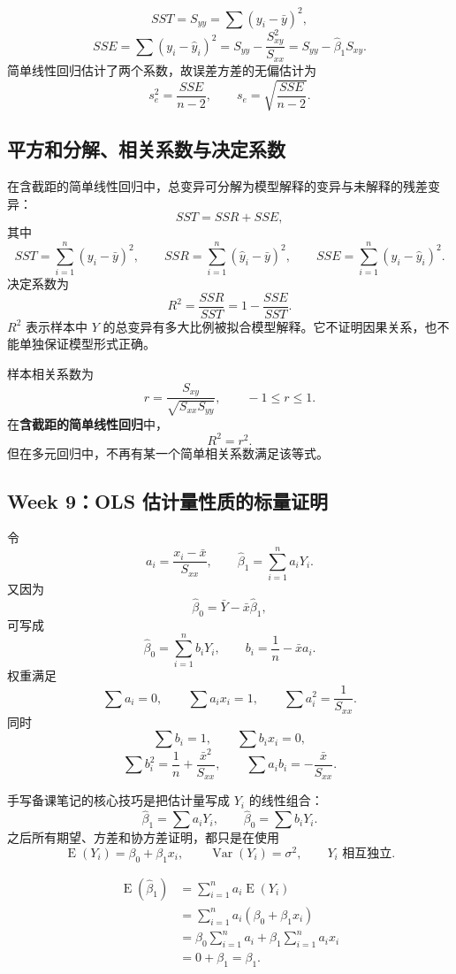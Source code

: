 \documentclass[11pt,a4paper]{article}
\newcommand{\E}{\operatorname{E}}
\newcommand{\Var}{\operatorname{Var}}
\newcommand{\1}{\mathbf{1}}
\begin{document}
\[
  SST=S_{yy}=\sum(y_i-\bar y)^2,
\]
\[
  SSE=\sum(y_i-\hat y_i)^2
  =
  S_{yy}-\frac{S_{xy}^2}{S_{xx}}
  =
  S_{yy}-\hat\beta_1S_{xy}.
\]
简单线性回归估计了两个系数，故误差方差的无偏估计为
\[
  \boxed{
  s_e^2=\frac{SSE}{n-2},
  \qquad
  s_e=\sqrt{\frac{SSE}{n-2}}.
  }
\]

\subsection{平方和分解、相关系数与决定系数}

在含截距的简单线性回归中，总变异可分解为模型解释的变异与未解释的残差变异：
\[
  \boxed{
  SST=SSR+SSE,
  }
\]
其中
\[
  SST=\sum_{i=1}^n(y_i-\bar y)^2,
  \qquad
  SSR=\sum_{i=1}^n(\hat y_i-\bar y)^2,
  \qquad
  SSE=\sum_{i=1}^n(y_i-\hat y_i)^2.
\]
决定系数为
\[
  \boxed{
  R^2=\frac{SSR}{SST}=1-\frac{SSE}{SST}.
  }
\]
$R^2$ 表示样本中 $Y$ 的总变异有多大比例被拟合模型解释。它不证明因果关系，也不能单独保证模型形式正确。

样本相关系数为
\[
  \boxed{
  r
  =
  \frac{S_{xy}}{\sqrt{S_{xx}S_{yy}}},
  \qquad -1\le r\le1.
  }
\]
在\textbf{含截距的简单线性回归}中，
\[
  \boxed{R^2=r^2.}
\]
但在多元回归中，不再有某一个简单相关系数满足该等式。

\subsection{Week 9：OLS 估计量性质的标量证明}

令
\[
  a_i=\frac{x_i-\bar x}{S_{xx}},
\qquad
  \hat\beta_1=\sum_{i=1}^na_iY_i.
\]
又因为
\[
  \hat\beta_0=\bar Y-\bar x\hat\beta_1,
\]
可写成
\[
  \hat\beta_0=\sum_{i=1}^nb_iY_i,
  \qquad
  b_i=\frac1n-\bar x a_i.
\]
权重满足
\[
  \sum a_i=0,
  \qquad
  \sum a_ix_i=1,
  \qquad
  \sum a_i^2=\frac1{S_{xx}}.
\]
同时
\[
  \sum b_i=1,
  \qquad
  \sum b_ix_i=0,
\]
\[
  \sum b_i^2=\frac1n+\frac{\bar x^2}{S_{xx}},
  \qquad
  \sum a_ib_i=-\frac{\bar x}{S_{xx}}.
\]

\begin{conceptbox}[老师手写证明的入口]
手写备课笔记的核心技巧是把估计量写成 $Y_i$ 的线性组合：
\[
  \hat\beta_1=\sum a_iY_i,
  \qquad
  \hat\beta_0=\sum b_iY_i.
\]
之后所有期望、方差和协方差证明，都只是在使用
\[
  \E(Y_i)=\beta_0+\beta_1x_i,\qquad
  \Var(Y_i)=\sigma^2,\qquad
  Y_i\text{ 相互独立}.
\]
\end{conceptbox}

\begin{proofbox}
\begin{align*}
  \E(\hat\beta_1)
  &=
  \sum_{i=1}^na_i\E(Y_i)\\
  &=
  \sum_{i=1}^na_i(\beta_0+\beta_1x_i)\\
  &=
  \beta_0\sum_{i=1}^na_i
  +
  \beta_1\sum_{i=1}^na_ix_i\\
  &=0+\beta_1=\beta_1.
\end{align*}
\end{proofbox}
\end{document}
